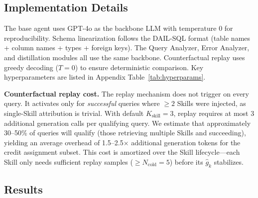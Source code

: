\subsection{Implementation Details}
\label{subsec:implementation}

The base agent uses GPT-4o as the backbone LLM with temperature 0 for reproducibility. Schema linearization follows the DAIL-SQL format (table names + column names + types + foreign keys). The Query Analyzer, Error Analyzer, and distillation modules all use the same backbone. Counterfactual replay uses greedy decoding ($T=0$) to ensure deterministic comparison. Key hyperparameters are listed in Appendix Table~\ref{tab:hyperparams}.

\textbf{Counterfactual replay cost.} The replay mechanism does not trigger on every query. It activates only for \emph{successful} queries where $\geq 2$ Skills were injected, as single-Skill attribution is trivial. With default $K_{\text{skill}}=3$, replay requires at most 3 additional generation calls per qualifying query. We estimate that approximately 30--50\% of queries will qualify (those retrieving multiple Skills and succeeding), yielding an average overhead of 1.5--2.5$\times$ additional generation tokens for the credit assignment subset. This cost is amortized over the Skill lifecycle---each Skill only needs sufficient replay samples ($\geq N_{\text{cold}}=5$) before its $\hat{g}_k$ stabilizes.

\subsection{Results}
\label{subsec:results}

